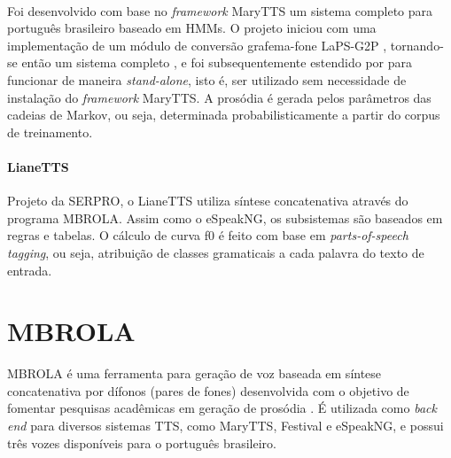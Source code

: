 
\paragraph{\cite{couto}}
Foi desenvolvido com base no \emph{framework} MaryTTS um sistema completo para
português brasileiro baseado em HMMs. O projeto iniciou com uma implementação
de um módulo de conversão grafema-fone LaPS-G2P \cite{g2pusp}, tornando-se então
um sistema completo \cite{couto}, e foi subsequentemente estendido por
\cite{costa} para funcionar de maneira \emph{stand-alone}, isto é, ser utilizado
sem necessidade de instalação do \emph{framework} MaryTTS. A prosódia é gerada
pelos parâmetros das cadeias de Markov, ou seja, determinada probabilisticamente
a partir do corpus de treinamento.


\paragraph{LianeTTS \cite{lianetts}}
Projeto da SERPRO, o LianeTTS utiliza síntese concatenativa através do programa
MBROLA. Assim como o eSpeakNG, os subsistemas são baseados em regras e tabelas.
O cálculo de curva f0 é feito com base em \emph{parts-of-speech tagging}, ou
seja, atribuição de classes gramaticais a cada palavra do texto de entrada.

\section{MBROLA}
\label{sec:mbrola}
MBROLA é uma ferramenta para geração de voz baseada em síntese concatenativa por
dífonos (pares de fones) desenvolvida com o objetivo de fomentar pesquisas
acadêmicas em geração de prosódia \cite{mbrola}. É utilizada como
\emph{back end} para diversos sistemas TTS, como MaryTTS, Festival
\cite{festival} e eSpeakNG, e possui três vozes disponíveis para o português
brasileiro. %

